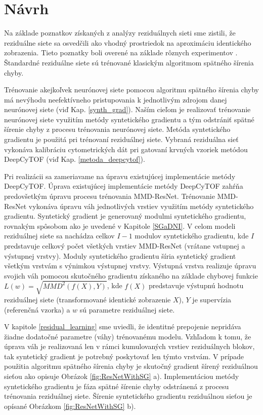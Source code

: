 \chapter{Návrh}  %
\label{navrh}

Na základe poznatkov získaných z analýzy reziduálnych sieti sme zistili, že reziduálne siete sa osvedčili ako vhodný prostriedok na aproximáciu identického zobrazenia. Tieto poznatky boli overené na základe rôznych experimentov \cite{Targ2016, He2016, Wu2017}. Štandardné reziduálne siete sú trénované klasickým algoritmom spätného šírenia chyby.

Trénovanie akejkoľvek neurónovej siete pomocou algoritmu spätného šírenia chyby má nevýhodu neefektívneho pristupovania k jednotlivým zdrojom danej neurónovej siete (viď Kap. \ref{synth_grad}). Naším cieľom je realizovať trénovanie neurónovej siete využitím metódy syntetického gradientu a tým odstrániť spätné šírenie chyby z procesu trénovania neurónovej siete. Metóda syntetického gradientu je použitá pri trénovaní reziduálnej siete. Vybraná reziduálna sieť vykonáva kalibráciu cytometrických dát pri gatovaní krvných vzoriek metódou DeepCyTOF (viď Kap. \ref{metoda_deepcytof}).

Pri realizácii sa zameriavame na úpravu existujúcej implementácie metódy DeepCyTOF. Úprava existujúcej implementácie metódy DeepCyTOF zahŕňa predovšetkým úpravu procesu trénovania MMD-ResNet. Trénovanie MMD-ResNet vykonáva úpravu váh jednotlivých vrstiev využitím metódy syntetického gradientu. Syntetický gradient je generovaný modulmi syntetického gradientu, rovnakým spôsobom ako je uvedené v Kapitole \ref{SGaDNI}. V celom modeli reziduálnej siete sa nachádza celkov $I-1$ modulov syntetického gradientu, kde $I$ predstavuje celkový počet všetkých vrstiev MMD-ResNet (vrátane vstupnej a výstupnej vrstvy). Moduly syntetického gradientu šíria syntetický gradient všetkým vrstvám s výnimkou výstupnej vrstvy. Výstupná vrstva realizuje úpravu svojich váh pomocou skutočného gradientu získaného na základe chybovej funkcie $L(w) = \sqrt{MMD^2(f(X),Y)}$, kde $f(X)$ predstavuje výstupnú hodnotu reziduálnej siete (transformované identické zobrazenie $X$), $Y$ je supervízia (referenčná vzorka) a $w$ sú parametre reziduálnej siete.


V kapitole \ref{residual_learning} sme uviedli, že identitné prepojenie nepridáva žiadne dodatočné parametre (váhy) trénovanému modelu. Vzhľadom k tomu, že úprava váh je realizovaná len v rámci kumulovaných vrstiev reziduálnych blokov, tak syntetický gradient je potrebný poskytovať len týmto vrstvám. V prípade použitia algoritmu spätného šírenia chyby je skutočný gradient šírený reziduálnou sieťou ako opisuje Obrázok \ref{fig:ResNetWithSG} a). Implementáciou metódy syntetického gradientu je fáza spätné šírenie chyby odstránená z procesu trénovania reziduálnej siete. Šírenie syntetického gradientu reziduálnou sieťou je opísané Obrázkom \ref{fig:ResNetWithSG} b).

